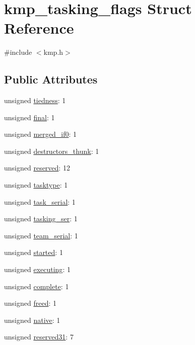 \hypertarget{structkmp__tasking__flags}{\section{kmp\-\_\-tasking\-\_\-flags Struct Reference}
\label{structkmp__tasking__flags}
}


{\ttfamily \#include $<$kmp.\-h$>$}

\subsection*{Public Attributes}
\begin{DoxyCompactItemize}
\item 
unsigned \hyperlink{structkmp__tasking__flags_a896a40bab626e74a4824539d1605d176}{tiedness}\-: 1
\item 
unsigned \hyperlink{structkmp__tasking__flags_adc49b76236bc45b6c68457f8e81230b7}{final}\-: 1
\item 
unsigned \hyperlink{structkmp__tasking__flags_a21feec95b8d05beac5923ca04b98ad0e}{merged\-\_\-if0}\-: 1
\item 
unsigned \hyperlink{structkmp__tasking__flags_a998b866c0ee12e696ddb77d334b61e72}{destructors\-\_\-thunk}\-: 1
\item 
unsigned \hyperlink{structkmp__tasking__flags_a5b6670b83f5fc82d678e44f8eec4fbf2}{reserved}\-: 12
\item 
unsigned \hyperlink{structkmp__tasking__flags_ac102ec6051f4b30f0e81c0f3b5d9e84a}{tasktype}\-: 1
\item 
unsigned \hyperlink{structkmp__tasking__flags_a1e4fa96ecc4d22b55ae1ddfa4f83bdfd}{task\-\_\-serial}\-: 1
\item 
unsigned \hyperlink{structkmp__tasking__flags_a68f882661553dde50d4ccc2e472e9f05}{tasking\-\_\-ser}\-: 1
\item 
unsigned \hyperlink{structkmp__tasking__flags_a69abf7c2ecf0b7284861a90c7ac0cfe1}{team\-\_\-serial}\-: 1
\item 
unsigned \hyperlink{structkmp__tasking__flags_a9242efec8f2956663c96a10a12601c22}{started}\-: 1
\item 
unsigned \hyperlink{structkmp__tasking__flags_a52dcbb49f0b94ac8ff3e130a54df591c}{executing}\-: 1
\item 
unsigned \hyperlink{structkmp__tasking__flags_a2bef3eff248d8bbbeaea3f77f918b1fc}{complete}\-: 1
\item 
unsigned \hyperlink{structkmp__tasking__flags_a44b2b3bfa5de44e0c8c8f8f63cf0c32c}{freed}\-: 1
\item 
unsigned \hyperlink{structkmp__tasking__flags_a6e26667bc33ef72a60338aaf00497f3a}{native}\-: 1
\item 
unsigned \hyperlink{structkmp__tasking__flags_a83c321dce84008628bb9b6f37653dda2}{reserved31}\-: 7
\end{DoxyCompactItemize}


